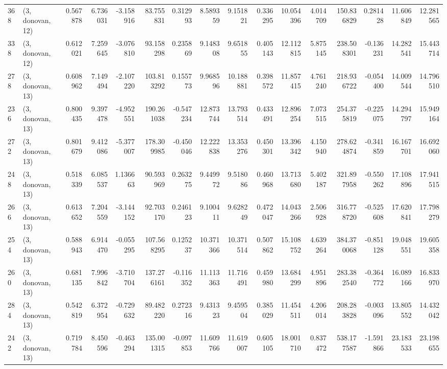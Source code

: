 \begin{tabular}{llrrrrrrrrrrrrrr}
368 &  (3, donovan, 12) &   0.567878 &   6.736031 &  -3.158916 &    83.755831 &   0.312993 &   8.589359 &   9.151821 &  0.336295 &  10.054396 &   4.014709 &   150.836829 &   0.281428 &  11.606849 &  12.281565 \\
338 &  (3, donovan, 12) &   0.612021 &   7.259645 &  -3.076810 &    93.158298 &   0.235869 &   9.148308 &   9.651855 &  0.405143 &  12.112815 &   5.875145 &   238.508301 &  -0.136231 &  14.282541 &  15.443714 \\
278 &  (3, donovan, 13) &   0.608962 &   7.149494 &  -2.107220 &   103.813292 &   0.155773 &   9.968596 &  10.188881 &  0.398572 &  11.857415 &   4.761240 &   218.936722 &  -0.054400 &  14.009544 &  14.796510 \\
236 &  (3, donovan, 13) &   0.800435 &   9.397478 &  -4.952551 &   190.261038 &  -0.547234 &  12.873744 &  13.793514 &  0.433491 &  12.896254 &   7.073515 &   254.375819 &  -0.225075 &  14.294797 &  15.949164 \\
272 &  (3, donovan, 13) &   0.801679 &   9.412086 &  -5.377007 &   178.309985 &  -0.450046 &  12.222838 &  13.353276 &  0.450301 &  13.396342 &   4.150940 &   278.624874 &  -0.341859 &  16.167701 &  16.692060 \\
248 &  (3, donovan, 13) &   0.518339 &   6.085537 &   1.136663 &    90.593969 &   0.263275 &   9.449972 &   9.518086 &  0.460968 &  13.713680 &   5.402187 &   321.897958 &  -0.550262 &  17.108896 &  17.941515 \\
266 &  (3, donovan, 13) &   0.613652 &   7.204559 &  -3.144152 &    92.703170 &   0.246123 &   9.100411 &   9.628249 &  0.472047 &  14.043266 &   2.506928 &   316.778720 &  -0.525608 &  17.620841 &  17.798279 \\
254 &  (3, donovan, 13) &   0.588943 &   6.914470 &  -0.055295 &   107.568295 &   0.125237 &  10.371366 &  10.371514 &  0.507862 &  15.108752 &   4.639264 &   384.370068 &  -0.851128 &  19.048551 &  19.605358 \\
260 &  (3, donovan, 13) &   0.681135 &   7.996842 &  -3.710704 &   137.276161 &  -0.116352 &  11.113363 &  11.716491 &  0.459980 &  13.684299 &   4.951896 &   283.382540 &  -0.364772 &  16.089166 &  16.833970 \\
284 &  (3, donovan, 13) &   0.542819 &   6.372954 &  -0.729632 &    89.482220 &   0.272316 &   9.431323 &   9.459504 &  0.385029 &  11.454511 &   4.206014 &   208.283828 &  -0.003096 &  13.805552 &  14.432042 \\
242 &  (3, donovan, 13) &   0.719784 &   8.450596 &  -0.463294 &   135.001315 &  -0.097853 &  11.609766 &  11.619007 &  0.605105 &  18.001710 &   0.837472 &   538.177587 &  -1.591866 &  23.183533 &  23.198655 \\

\end{tabular}
